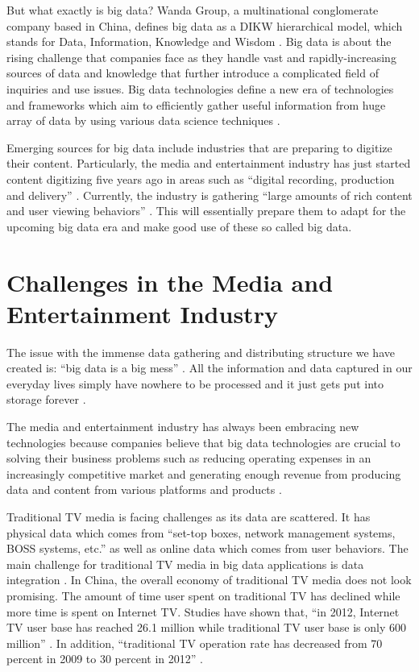 But what exactly is big data? Wanda Group, a multinational conglomerate company based in China, defines big data as a DIKW hierarchical model, which stands for Data, Information, Knowledge and Wisdom \cite{Zhang2017era}. Big data is about the rising challenge that companies face as they handle vast and rapidly-increasing sources of data and knowledge that further introduce a complicated field of inquiries and use issues. Big data technologies define a new era of technologies and frameworks which aim to efficiently gather useful information from huge array of data by using various data science techniques \cite{Villars2011care}.

Emerging sources for big data include industries that are preparing to digitize their content. Particularly, the media and entertainment industry has just started content digitizing five years ago in areas such as ``digital recording, production and delivery'' \cite{Villars2011care}. Currently, the industry is gathering ``large amounts of rich content and user viewing behaviors'' \cite{Villars2011care}. This will essentially prepare them to adapt for the upcoming big data era and make good use of these so called big data. 

\section{Challenges in the Media and Entertainment Industry}

The issue with the immense data gathering and distributing structure we have created is: ``big data is a big mess'' \cite{Schlieski2012data}. All the information and data captured in our everyday lives simply have nowhere to be processed and it just gets put into storage forever \cite{Schlieski2012data}.

The media and entertainment industry has always been embracing new technologies because companies believe that big data technologies are crucial to solving their business problems such as reducing operating expenses in an increasingly competitive market and generating enough revenue from producing data and content from various platforms and products \cite{Lippell2016sectors}.

Traditional TV media is facing challenges as its data are scattered. It has physical data which comes from ``set-top boxes, network management systems, BOSS systems, etc.'' \cite{Zhang2017era} as well as online data which comes from user behaviors. The main challenge for traditional TV media in big data applications is data integration \cite{Zhang2017era}. In China, the overall economy of traditional TV media does not look promising. The amount of time user spent on traditional TV has declined while more time is spent on Internet TV. Studies have shown that, ``in 2012, Internet TV user base has reached 26.1 million while traditional TV user base is only 600 million'' \cite{Zhang2017era}. In addition, ``traditional TV operation rate has decreased from 70 percent in 2009 to 30 percent in 2012'' \cite{Zhang2017era}.

